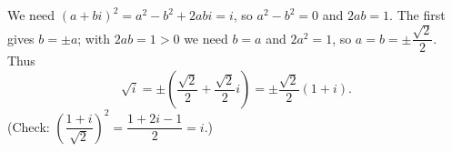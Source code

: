 We need $(a+bi)^2=a^2-b^2+2abi=i$, so $a^2-b^2=0$ and $2ab=1$. The first gives $b=\pm a$; with $2ab=1>0$ we need $b=a$ and $2a^2=1$, so $a=b=\pm\dfrac{\sqrt2}{2}$. Thus
\[\sqrt{i}=\pm\left(\dfrac{\sqrt2}{2}+\dfrac{\sqrt2}{2}i\right)=\boxed{\pm\dfrac{\sqrt2}{2}(1+i)}.\]
(Check: $\left(\dfrac{1+i}{\sqrt2}\right)^2=\dfrac{1+2i-1}{2}=i$.)
